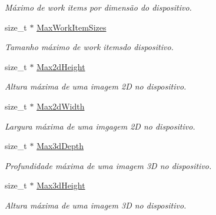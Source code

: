 \begin{DoxyCompactItemize}
\begin{DoxyCompactList}\small\item\em Máximo de work items por dimensão do dispositivo. \end{DoxyCompactList}\item 
\hypertarget{structdevices_af79cf84f1d71d8481d3e04a79294d0ed}{}\label{structdevices_af79cf84f1d71d8481d3e04a79294d0ed} 
size\+\_\+t $\ast$ \hyperlink{structdevices_af79cf84f1d71d8481d3e04a79294d0ed}{Max\+Work\+Item\+Sizes}
\begin{DoxyCompactList}\small\item\em Tamanho máximo de work itemsdo dispositivo. \end{DoxyCompactList}\item 
\hypertarget{structdevices_add04e0f60e2a9e3f67cceca10f8c3685}{}\label{structdevices_add04e0f60e2a9e3f67cceca10f8c3685} 
size\+\_\+t $\ast$ \hyperlink{structdevices_add04e0f60e2a9e3f67cceca10f8c3685}{Max2d\+Height}
\begin{DoxyCompactList}\small\item\em Altura máxima de uma imagem 2D no dispositivo. \end{DoxyCompactList}\item 
\hypertarget{structdevices_a18f56dc01b4463c4ded05b3d35c829d8}{}\label{structdevices_a18f56dc01b4463c4ded05b3d35c829d8} 
size\+\_\+t $\ast$ \hyperlink{structdevices_a18f56dc01b4463c4ded05b3d35c829d8}{Max2d\+Width}
\begin{DoxyCompactList}\small\item\em Largura máxima de uma imgagem 2D no dispositivo. \end{DoxyCompactList}\item 
\hypertarget{structdevices_acaf6beb0a2264711c7819587a4459ac2}{}\label{structdevices_acaf6beb0a2264711c7819587a4459ac2} 
size\+\_\+t $\ast$ \hyperlink{structdevices_acaf6beb0a2264711c7819587a4459ac2}{Max3d\+Depth}
\begin{DoxyCompactList}\small\item\em Profundidade máxima de uma imagem 3D no dispositivo. \end{DoxyCompactList}\item 
\hypertarget{structdevices_a556a1e11d72df9890409b935d0582f89}{}\label{structdevices_a556a1e11d72df9890409b935d0582f89} 
size\+\_\+t $\ast$ \hyperlink{structdevices_a556a1e11d72df9890409b935d0582f89}{Max3d\+Height}
\begin{DoxyCompactList}\small\item\em Altura máxima de uma imagem 3D no dispositivo. \end{DoxyCompactList}\item 

\end{DoxyCompactItemize}
